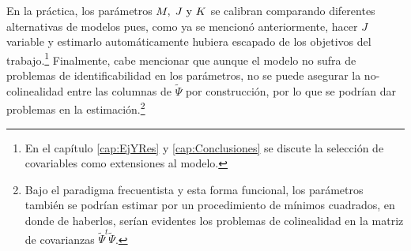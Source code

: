 \documentclass[../Main/Main.tex]{subfiles}
\begin{document}
En la práctica, los parámetros $M,\;J\text{ y }K$ se calibran comparando diferentes alternativas de modelos pues, como ya se mencionó anteriormente, hacer $J$ variable y estimarlo automáticamente hubiera escapado de los objetivos del trabajo.\footnote{En el capítulo \ref{cap:EjYRes} y \ref{cap:Conclusiones} se discute la selección de covariables como extensiones al modelo.} Finalmente, cabe mencionar que aunque el modelo no sufra de problemas de identificabilidad en los parámetros, no se puede asegurar la no-colinealidad entre las columnas de $\widetilde{\Psi}$ por construcción, por lo que se podrían dar problemas en la estimación.\footnote{Bajo el paradigma frecuentista y esta forma funcional, los parámetros también se podrían estimar por un procedimiento de mínimos cuadrados, en donde de haberlos, serían evidentes los problemas de colinealidad en la matriz de covarianzas $\widetilde\Psi^t\widetilde\Psi$.}
\end{document}

